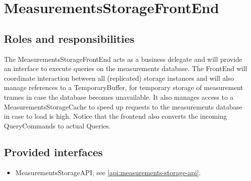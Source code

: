 \section{MeasurementsStorageFrontEnd}
\label{element:measurements-storage-front-end}

\subsection{Roles and responsibilities}

\npar The MeasurementsStorageFrontEnd acts as a business delegate and will
provide an interface to execute queries on the measurements database. The
FrontEnd will coordinate interaction between all (replicated) storage instances
and will also manage references to a TemporaryBuffer, for temporary storage of
measurement trames in case the database becomes unavailable. It also manages
access to a MeasurementsStorageCache to speed up requests to the measurements
database in case to load is high. Notice that the frontend also converts the
incoming QueryCommands to actual Queries.

\subsection{Provided interfaces}

\begin{itemize}
  \item MeasurementsStorageAPI, see \ref{api:measurements-storage-api}.
\end{itemize}